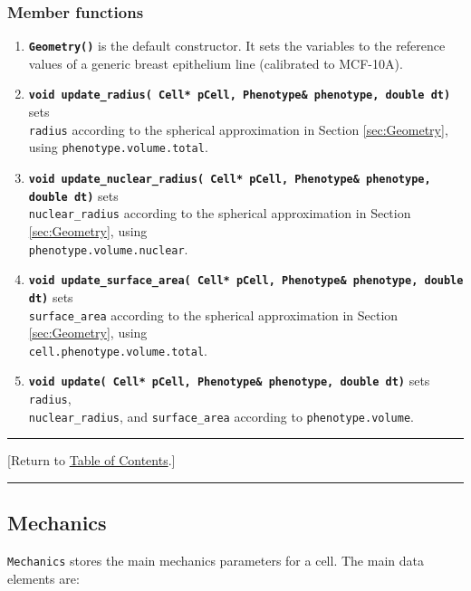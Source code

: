 \documentclass[12pt]{article}
\renewcommand{\v}{\verb}
\newcommand{\smallcode}[1]{\textbf{\texttt{#1}}}
\newcommand{\blue}[1]{\textcolor{blue}{#1}}
\newcommand{\DONE}{}%
\newcommand{\TOClink}{\begin{center}\hrule\vskip-5pt\phantom{.}\hfill[Return to \hyperlink{TOC}{Table of Contents}.]\hfill\phantom{.}\vskip3pt\hrule\end{center}}
\begin{document}
\subsubsection{Member functions}
\begin{enumerate}
\item 
\smallcode{Geometry()} is the default constructor. It sets the variables to the reference values of 
a generic breast epithelium line (calibrated to MCF-10A).  

\item 
\smallcode{void update\_radius( Cell* pCell, Phenotype\& phenotype, double dt)} sets \\ \v|radius| according to the spherical approximation in Section \ref{sec:Geometry}, 
using \v|phenotype.volume.total|. 

\item 
\smallcode{void update\_nuclear\_radius( Cell* pCell, Phenotype\& phenotype, 
double dt)} sets \\ \v|nuclear_radius| according to the spherical approximation in Section \ref{sec:Geometry}, 
using \\ \v|phenotype.volume.nuclear|. 

\item
\smallcode{void update\_surface\_area( Cell* pCell, Phenotype\& phenotype, double dt)} sets \\ \v|surface_area| according to the spherical approximation in Section \ref{sec:Geometry}, 
using \\ \v|cell.phenotype.volume.total|. 

\item 
\smallcode{void update( Cell* pCell, Phenotype\& phenotype, double dt)} sets \v|radius|, \\ \v|nuclear_radius|, and \v|surface_area| according to \v|phenotype.volume|. 
\end{enumerate}

\TOClink

\subsection{Mechanics \DONE}
\label{sec:Mechanics}
\v|Mechanics| stores the main mechanics parameters for a cell. The main data elements are: 
\end{document}
